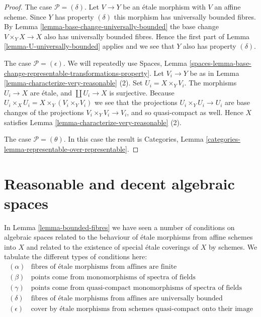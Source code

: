 \documentclass{stacks-project}
\theoremstyle{plain}
\theoremstyle{definition}
\theoremstyle{remark}
\numberwithin{equation}{subsection}
\begin{document}
\begin{proof}
\medskip\noindent
The case $\mathcal{P} = (\delta)$. Let $V \to Y$ be an \'etale morphism with
$V$ an affine scheme. Since $Y$ has property $(\delta)$ this morphism has
universally bounded fibres. By
Lemma \ref{lemma-base-change-universally-bounded}
the base change $V \times_Y X \to X$ also has universally bounded fibres.
Hence the first part of
Lemma \ref{lemma-U-universally-bounded}
applies and we see that $Y$ also has property $(\delta)$.

\medskip\noindent
The case $\mathcal{P} = (\epsilon)$. We will repeatedly use
Spaces, Lemma
\ref{spaces-lemma-base-change-representable-transformations-property}.
Let $V_i \to Y$ be as in
Lemma \ref{lemma-characterize-very-reasonable} (2).
Set $U_i = X \times_Y V_i$. The morphisms $U_i \to X$ are \'etale,
and $\coprod U_i \to X$ is surjective. Because
$U_i \times_X U_i = X \times_Y (V_i \times_Y V_i)$ we see
that the projections $U_i \times_Y U_i \to U_i$ are
base changes of the projections $V_i \times_Y V_i \to V_i$, and so
quasi-compact as well. Hence $X$ satisfies
Lemma \ref{lemma-characterize-very-reasonable} (2).

\medskip\noindent
The case $\mathcal{P} = (\theta)$. In this case the result is
Categories, Lemma \ref{categories-lemma-representable-over-representable}.
\end{proof}











\section{Reasonable and decent algebraic spaces}
\label{section-reasonable-decent}

\noindent
In
Lemma \ref{lemma-bounded-fibres}
we have seen a number of conditions on algebraic spaces related to
the behaviour of \'etale morphisms from affine schemes into $X$
and related to the existence of special \'etale coverings of $X$ by
schemes. We tabulate the different types of conditions here:
$$
\boxed{
\begin{matrix}
(\alpha) & \text{fibres of \'etale morphisms from affines are finite} \\
(\beta) & \text{points come from monomorphisms of spectra of fields} \\
(\gamma) & \text{points come from quasi-compact monomorphisms of
spectra of fields} \\
(\delta) & \text{fibres of \'etale morphisms from affines are universally
bounded} \\
(\epsilon) & \text{cover by \'etale morphisms from schemes quasi-compact
onto their image}
\end{matrix}
}
$$
\end{document}
